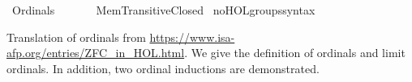%
\begin{isabellebody}%
%
%
\isadelimdocument
%
\endisadelimdocument
%
\isatagdocument
\isanewline
%
\isamarkuptrue%
%
\endisatagdocument
{\isafolddocument}%
%
\isadelimdocument
%
\endisadelimdocument
%
\isadelimtheory
%
\endisadelimtheory
%
\isatagtheory
{}\isamarkupfalse%
\ Ordinals\isanewline
\ \ \isanewline
\ \ \ \ Mem{\isacharunderscore}{\kern0pt}Transitive{\isacharunderscore}{\kern0pt}Closed\isanewline
{}%
\endisatagtheory
{\isafoldtheory}%
%
\isadelimtheory
\isanewline
%
\endisadelimtheory
\isanewline
{}\isamarkupfalse%
\ no{\isacharunderscore}{\kern0pt}HOL{\isacharunderscore}{\kern0pt}groups{\isacharunderscore}{\kern0pt}syntax%
\isadelimdocument
%
\endisadelimdocument
%
\isatagdocument
%
\isamarkuptrue%
%
\endisatagdocument
{\isafolddocument}%
%
\isadelimdocument
%
\endisadelimdocument
%
\begin{isamarkuptext}%
Translation of ordinals from \url{https://www.isa-afp.org/entries/ZFC_in_HOL.html}.
We give the definition of ordinals and limit ordinals. In addition,
two ordinal inductions are demonstrated.


\end{isamarkuptext}
\end{isabellebody}

